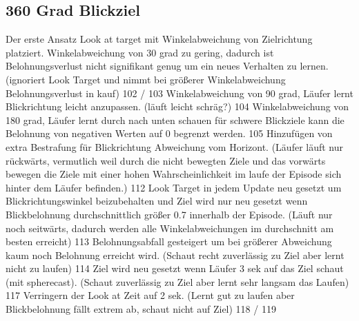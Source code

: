 \subsection{360 Grad Blickziel}
Der erste Ansatz 
Look at target mit Winkelabweichung von Zielrichtung platziert. Winkelabweichung von 30 grad zu gering, dadurch ist Belohnungsverlust nicht signifikant genug um ein neues Verhalten zu lernen. (ignoriert Look Target und nimmt bei größerer Winkelabweichung Belohnungsverlust in kauf) 102 / 103
Winkelabweichung von 90 grad, Läufer lernt Blickrichtung leicht anzupassen. (läuft leicht schräg?) 104
Winkelabweichung von 180 grad, Läufer lernt durch nach unten schauen für schwere Blickziele kann die Belohnung von negativen Werten auf 0 begrenzt werden. 105
Hinzufügen von extra Bestrafung für Blickrichtung Abweichung vom Horizont. (Läufer läuft nur rückwärts, vermutlich weil durch die nicht bewegten Ziele und das vorwärts bewegen die Ziele mit einer hohen Wahrscheinlichkeit im laufe der Episode sich hinter dem Läufer befinden.) 112
Look Target in jedem Update neu gesetzt um Blickrichtungswinkel beizubehalten und Ziel wird nur neu gesetzt wenn Blickbelohnung durchschnittlich größer 0.7 innerhalb der Episode. (Läuft nur noch seitwärts, dadurch werden alle Winkelabweichungen im durchschnitt am besten erreicht) 113
Belohnungsabfall gesteigert um bei größerer Abweichung kaum noch Belohnung erreicht wird. (Schaut recht zuverlässig zu Ziel aber lernt nicht zu laufen) 114
Ziel wird neu gesetzt wenn Läufer 3 sek auf das Ziel schaut (mit spherecast). (Schaut zuverlässig zu Ziel aber lernt sehr langsam das Laufen) 117
Verringern der Look at Zeit auf 2 sek. (Lernt gut zu laufen aber Blickbelohnung fällt extrem ab, schaut nicht auf Ziel) 118 / 119